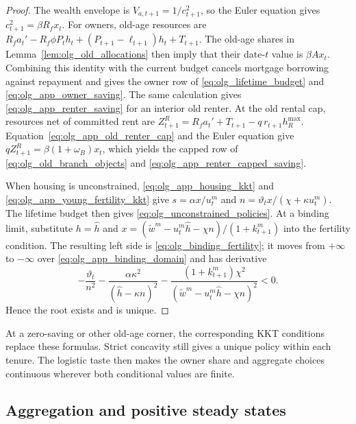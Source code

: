 \begin{proof}
The wealth envelope is $V_{a,t+1}=1/c_{t+1}^2$, so the Euler equation gives
$c_{t+1}^2=\beta R_fx_t$.  For owners, old-age resources are
$R_fa_t'-R_f\phi P_th_t+(P_{t+1}-\ell_{t+1})h_t+T_{t+1}$.
The old-age shares in Lemma~\ref{lem:olg_old_allocations} then imply that their
date-$t$ value is $\beta A x_t$.  Combining this identity with the current
budget cancels mortgage borrowing against repayment and gives the owner row of
\eqref{eq:olg_lifetime_budget} and \eqref{eq:olg_app_owner_saving}.  The same
calculation gives \eqref{eq:olg_app_renter_saving} for an interior old renter.
At the old rental cap, resources net of committed rent are
$Z_{t+1}^R=R_fa_t'+T_{t+1}-q\,r_{t+1}h_R^{\max}$.
Equation~\eqref{eq:olg_app_old_renter_cap} and the Euler equation give
$qZ_{t+1}^R=\beta(1+\omega_B)x_t$, which yields the capped row of
\eqref{eq:olg_old_branch_objects} and
\eqref{eq:olg_app_renter_capped_saving}.

When housing is unconstrained, \eqref{eq:olg_app_housing_kkt} and
\eqref{eq:olg_app_young_fertility_kkt} give
$s=\alpha x/u_t^m$ and
$n=\vartheta_tx/(\chi+\kappa u_t^m)$.  The lifetime budget then gives
\eqref{eq:olg_unconstrained_policies}.  At a binding limit, substitute
$h=\widehat h$ and
$x=(\widetilde w^m-u_t^m\widehat h-\chi n)/(1+k_{t+1}^m)$ into the fertility
condition.  The resulting left side is \eqref{eq:olg_binding_fertility}; it
moves from $+\infty$ to $-\infty$ over
\eqref{eq:olg_app_binding_domain} and has derivative
\begin{equation}
 -\frac{\vartheta_t}{n^2}
 -\frac{\alpha\kappa^2}{(\widehat h-\kappa n)^2}
 -\frac{(1+k_{t+1}^m)\chi^2}
 {(\widetilde w^m-u_t^m\widehat h-\chi n)^2}<0.
\end{equation}
Hence the root exists and is unique.
\end{proof}

At a zero-saving or other old-age corner, the corresponding KKT conditions
replace these formulas.  Strict concavity still gives a unique policy within
each tenure.  The logistic taste then makes the owner share and aggregate
choices continuous wherever both conditional values are finite.

\subsection{Aggregation and positive steady states}
\label{app:olg_steady_states}

